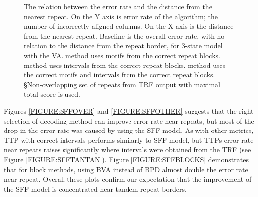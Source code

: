 \begin{figure}
\begin{center}
\caption[Relation between the error rate and distance from the repeat]{
The relation between the error rate and the distance from the nearest repeat. On the Y
axis is error rate of the algorithm; the number of incorrectly aligned columns.
On the X axis is the distance from the nearest repeat. Baseline is the overall
error rate, with no relation to the distance from the repeat border, for
3-state model with the VA.
\M method uses motifs from the correct repeat blocks.
\D method uses intervals from the correct repeat blocks.
\MM method uses the correct motifs and intervals from the
    correct repeat blocks.
\S Non-overlapping set of repeats from TRF output with maximal total
    score is used.}\label{FIGURE:SFF_GRAPHS} 
\end{center}
\end{figure}

Figures \ref{FIGURE:SFFOVER} and \ref{FIGURE:SFFOTHER} suggests that the right
selection of decoding method can improve error rate near repeats, but most of
the drop in the error rate was caused by using the SFF model. As with other
metrics, TTP with correct intervals performs similarly to SFF model, but TTPs
error rate near repeats raises significantly where intervals were obtained from
the TRF (see Figure \ref{FIGURE:SFFTANTAN}).  Figure \ref{FIGURE:SFFBLOCKS}
demonstrates that for block methods, using BVA instead of BPD almost double the error rate
near repeat.  Overall these plots confirm our expectation that the improvement of the SFF
model is concentrated near tandem repeat borders.

